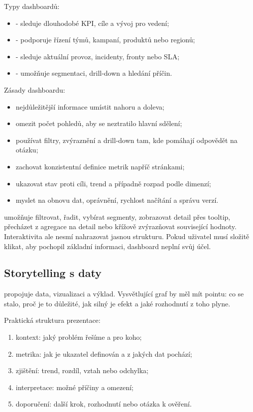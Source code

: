 Typy dashboardů:
\begin{itemize}
  \item {} - sleduje dlouhodobé KPI, cíle a vývoj pro vedení;
  \item {} - podporuje řízení týmů, kampaní, produktů nebo regionů;
  \item {} - sleduje aktuální provoz, incidenty, fronty nebo SLA;
  \item {} - umožňuje segmentaci, drill-down a hledání příčin.
\end{itemize}

Zásady dashboardu:
\begin{itemize}
  \item nejdůležitější informace umístit nahoru a doleva;
  \item omezit počet pohledů, aby se neztratilo hlavní sdělení;
  \item používat filtry, zvýraznění a drill-down tam, kde pomáhají odpovědět na otázku;
  \item zachovat konzistentní definice metrik napříč stránkami;
  \item ukazovat stav proti cíli, trend a případně rozpad podle dimenzí;
  \item myslet na obnovu dat, oprávnění, rychlost načítání a správu verzí.
\end{itemize}

 umožňuje filtrovat, řadit, vybírat segmenty, zobrazovat detail přes tooltip,
přecházet z agregace na detail nebo křížově zvýrazňovat související hodnoty. Interaktivita ale nesmí
nahrazovat jasnou strukturu. Pokud uživatel musí složitě klikat, aby pochopil základní informaci,
dashboard neplní svůj účel.

\subsection{Storytelling s daty}
 propojuje data, vizualizaci a výklad. Vysvětlující graf by měl mít pointu:
co se stalo, proč je to důležité, jak silný je efekt a jaké rozhodnutí z toho plyne.

Praktická struktura prezentace:
\begin{enumerate}
  \item kontext: jaký problém řešíme a pro koho;
  \item metrika: jak je ukazatel definován a z jakých dat pochází;
  \item zjištění: trend, rozdíl, vztah nebo odchylka;
  \item interpretace: možné příčiny a omezení;
  \item doporučení: další krok, rozhodnutí nebo otázka k ověření.
\end{enumerate}

